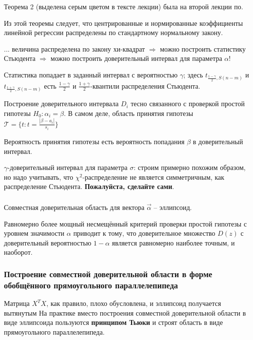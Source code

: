 \documentclass[main.tex]{subfiles}
\begin{document}
Теорема 2 (выделена серым цветом в тексте лекции) была на второй лекции по.

Из этой теоремы следует, что центрированные и нормированные коэффициенты линейной регрессии распределены по стандартному нормальному закону.

... величина распределена по закону хи-квадрат $ \Rightarrow $ можно построить статистику Стьюдента $ \Rightarrow $ можно построить доверительный интервал для параметра $ \alpha $!

Статистика попадает в заданный интервал с вероятностью $ \gamma $; здесь $ t_{\frac{1-\gamma}{2}, S(n-m)} $ и $ t_{\frac{1+\gamma}{2}, S(n-m)} $ есть $ \frac{1-\gamma}{2} $ и $ \frac{1+\gamma}{2} $-квантили распределения Стьюдента.

Построение доверительного интервала $ D_i $ тесно связанного с проверкой простой гипотезы $ H_0: \alpha_i = \beta $.
В самом деле, область принятия гипотезы $ \mathcal{T} = \{ t: t = \frac{|\beta - a_i|}{s_i} \} $

Вероятность принятия гипотезы есть вероятность попадания $ \beta $ в доверительный интервал.

$ \gamma $-доверительный интервал для параметра $ \sigma $: строим примерно похожим образом, но надо учитывать, что $ \chi^2 $-распределение не является симметричным, как распределение Стьюдента.
\textbf{Пожалуйста, сделайте сами}.


\subsubsection{} %

Совместная доверительная область для вектора $ \vec \alpha $ -- эллипсоид.

\begin{theorem}
    Равномерно более мощный несмещённый критерий проверки простой гипотезы с уровнем значимости $ \alpha $ приводит к тому, что доверительное множество $ D(z) $ с доверительный вероятностью $ 1 - \alpha $ является равномерно наиболее точным, и наоборот.
\end{theorem}

\subsubsection{Построение совместной доверительной области в форме обобщённого прямоугольного параллелепипеда}

Матрица $ X^TX $, как правило, плохо обусловлена, и эллипсоид получается вытянутым
На практике вместо построения совместной доверительной области в виде эллипсоида пользуются \textbf{принципом Тьюки} и строят область в виде прямоугольного параллелепипеда.
\end{document}
